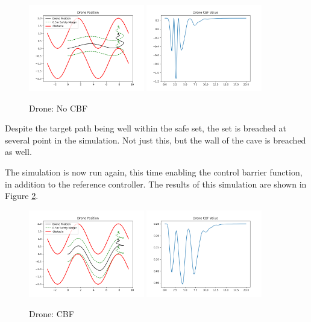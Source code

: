 \begin{figure}[H]
    \centering
    \includegraphics[width=0.45\textwidth]{Figures/Examples/Drone/DronePathNoCBF.png}
    \includegraphics[width=0.45\textwidth]{Figures/Examples/Drone/DroneNoCBFValue.png}
    \caption{Drone: No CBF}
    \label{fig:DronePathNoCBF}
\end{figure}

\noindent Despite the target path being well within the safe set, the set is breached at several point in the simulation. Not just this, but the wall of the cave is breached as well. \newline

The simulation is now run again, this time enabling the control barrier function, in addition to the reference controller. The results of this simulation are shown in Figure \ref{fig:DronePathCBF}.

\begin{figure}[H]
    \centering
    \includegraphics[width=0.45\textwidth]{Figures/Examples/Drone/DronePathCBF.png}
    \includegraphics[width=0.45\textwidth]{Figures/Examples/Drone/DroneCBFValue.png}
    \caption{Drone: CBF}
    \label{fig:DronePathCBF}
\end{figure}


